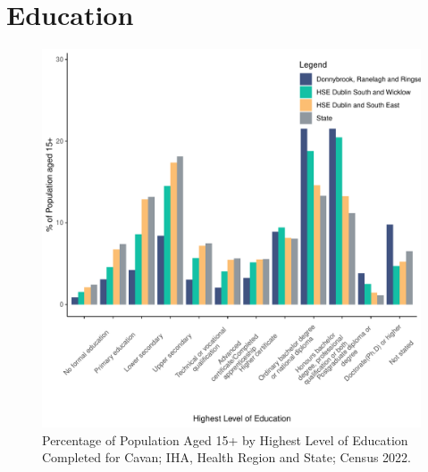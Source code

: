 \documentclass{article}
\begin{document}
\section{Education}\label{sect:Edu}
\begin{figure}[H]
	\centering
	\includegraphics[width = 120mm]{../figures/EduED.pdf}
	\caption{Percentage of Population Aged 15+ by Highest Level of Education Completed for Cavan; IHA, Health Region and State; Census 2022.}
	\label{fig:vbnv}
	\end{figure}
\end{document}
